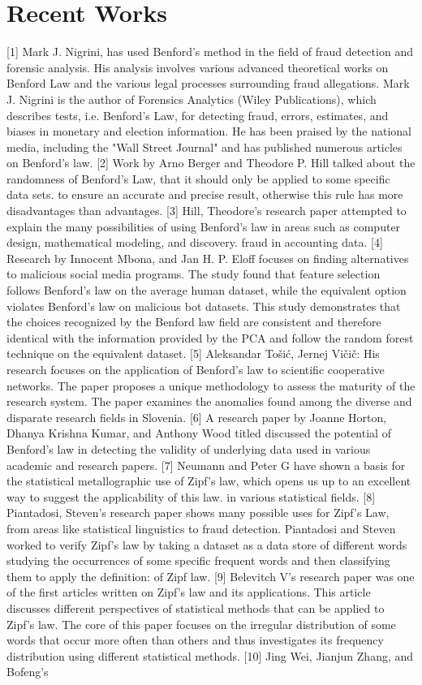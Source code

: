 \documentclass[conference]{IEEEtran}
\begin{document}
\section{Recent Works}
[1] Mark J. Nigrini, has used Benford's method in the field of fraud detection and forensic analysis. His analysis involves various advanced theoretical works on Benford Law and the various legal processes surrounding fraud allegations. Mark J. Nigrini is the author of Forensics Analytics (Wiley Publications), which describes tests, i.e. Benford's Law, for detecting fraud, errors, estimates, and biases in monetary and election information. He has been praised by the national media, including the "Wall Street Journal" and has published numerous articles on Benford's law. [2] Work by Arno Berger and Theodore P. Hill talked about the randomness of Benford's Law, that it should only be applied to some specific data sets. to ensure an accurate and precise result, otherwise this rule has more disadvantages than advantages. [3] Hill, Theodore's research paper attempted to explain the many possibilities of using Benford's law in areas such as computer design, mathematical modeling, and discovery. fraud in accounting data. [4] Research by Innocent Mbona, and Jan H. P. Eloff focuses on finding alternatives to malicious social media programs. The study found that feature selection follows Benford's law on the average human dataset, while the equivalent option violates Benford's law on malicious bot datasets. This study demonstrates that the choices recognized by the Benford law field are consistent and therefore identical with the information provided by the PCA and follow the random forest technique on the equivalent dataset. [5] Aleksandar Tošić, Jernej Vičič: His research focuses on the application of Benford's law to scientific cooperative networks. The paper proposes a unique methodology to assess the maturity of the research system. The paper examines the anomalies found among the diverse and disparate research fields in  Slovenia. [6] A research paper by Joanne Horton, Dhanya Krishna Kumar, and Anthony Wood titled discussed the potential of Benford's law in detecting the validity of underlying data used in various academic and research papers. [7] Neumann and Peter G have shown a basis for the statistical metallographic use of Zipf's law, which opens us up to an excellent way to suggest the applicability of this law. in various statistical fields. [8] Piantadosi, Steven's research paper shows many possible uses for Zipf's Law, from areas like statistical linguistics to fraud detection. Piantadosi and Steven worked to verify Zipf's law by taking a dataset as a data store of different words studying the occurrences of some specific frequent words and then classifying them to apply the definition: of Zipf law. [9] Belevitch V's research paper was one of the first articles written on Zipf's law and its applications. This article discusses different perspectives of statistical methods that can be applied to Zipf's law. The core of this paper focuses on the irregular distribution of some words that occur more often than others and thus investigates its frequency distribution using different statistical methods. [10] Jing Wei, Jianjun Zhang, and Bofeng’s 
\end{document}
